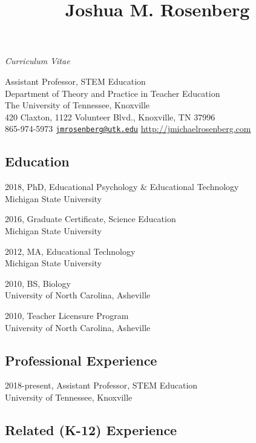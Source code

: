 \documentclass[]{article}
\title{Joshua M. Rosenberg}
\author{}
\date{}
\begin{document}
\maketitle

\begin{center}
\textit{Curriculum Vitae}
\end{center}

\begingroup
\center
Assistant Professor, STEM Education\\
Department of Theory and Practice in Teacher Education\\
The University of Tennessee, Knoxville\\
420 Claxton, 1122 Volunteer Blvd., Knoxville, TN 37996\\
865-974-5973 \textbar{}
\href{mailto:jmrosenberg@utk.edu}{\nolinkurl{jmrosenberg@utk.edu}}
\textbar{} \url{http://jmichaelrosenberg.com}\\
\endgroup

\subsection{Education}\label{education}

2018, PhD, Educational Psychology \& Educational Technology\\
Michigan State University

2016, Graduate Certificate, Science Education\\
Michigan State University

2012, MA, Educational Technology\\
Michigan State University

2010, BS, Biology\\
University of North Carolina, Asheville

2010, Teacher Licensure Program\\
University of North Carolina, Asheville

\subsection{Professional Experience}\label{professional-experience}

2018-present, Assistant Professor, STEM Education\\
University of Tennessee, Knoxville

\subsection{Related (K-12) Experience}\label{related-k-12-experience}
\end{document}
